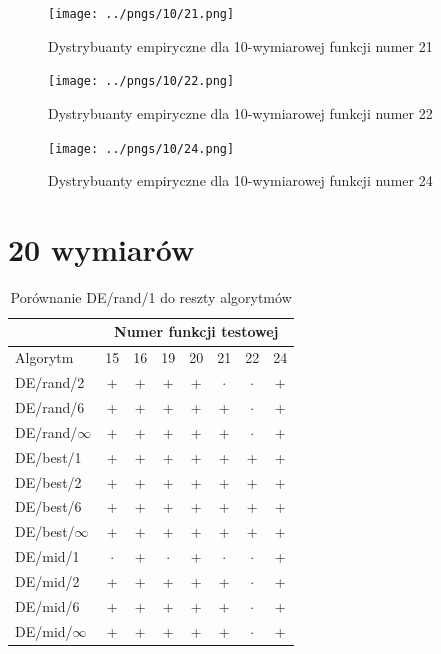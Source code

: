 \documentclass[a4paper,onecolumn,oneside,12pt,wide,floatssmall]{mwrep}
\theoremstyle{definition}
\theoremstyle{plain}%
\theoremstyle{remark}
\begin{document}
\begin{figure}[H]
\centering
\texttt{[image: ../pngs/10/21.png]}
\caption{Dystrybuanty empiryczne dla 10-wymiarowej funkcji numer 21}
\end{figure}

\begin{figure}[H]
\centering
\texttt{[image: ../pngs/10/22.png]}
\caption{Dystrybuanty empiryczne dla 10-wymiarowej funkcji numer 22}
\end{figure}

\begin{figure}[H]
\centering
\texttt{[image: ../pngs/10/24.png]}
\caption{Dystrybuanty empiryczne dla 10-wymiarowej funkcji numer 24}
\end{figure}

\section{20 wymiarów}

\begin{table}[H]
\centering
\begin{tabular}{ l | c | c | c | c | c | c | c }
		 & \multicolumn{7}{c}{Numer funkcji testowej}  \\  \hline
Algorytm         &15& 16& 19& 20& 21& 22& 24 \\ \hline
DE/rand/2	 & + & + & + & + & $\cdot$ & $\cdot$ & + \\
DE/rand/6	 & + & + & + & + & + & $\cdot$ & + \\
DE/rand/$\infty$	 & + & + & + & + & + & $\cdot$ & + \\
DE/best/1	 & + & + & + & + & + & + & + \\
DE/best/2	 & + & + & + & + & + & + & + \\
DE/best/6	 & + & + & + & + & + & + & + \\
DE/best/$\infty$	 & + & + & + & + & + & + & + \\
DE/mid/1	 & $\cdot$ & + & $\cdot$ & + & $\cdot$ & $\cdot$ & + \\
DE/mid/2	 & + & + & + & + & + & $\cdot$ & + \\
DE/mid/6	 & + & + & + & + & + & $\cdot$ & + \\
DE/mid/$\infty$	 & + & + & + & + & + & $\cdot$ & + \\
\end{tabular}
\caption{Porównanie DE/rand/1 do reszty algorytmów}
\end{table}
\end{document}
